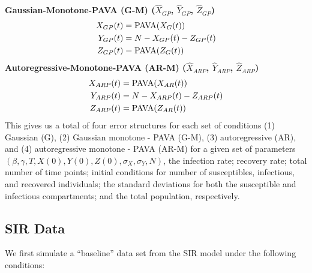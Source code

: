 \documentclass[12pt]{article}
\begin{document}
\noindent \textbf{Gaussian-Monotone-PAVA (G-M) ($\hat{X}_{GP}$, $\hat{Y}_{GP}$, $\hat{Z}_{GP}$)}
\begin{align*}
 X_{GP}(t) &= \textnormal{PAVA}(X_G(t)) \\
  Y_{GP}(t) &= N - X_{GP}(t) - Z_{GP}(t) \\
  Z_{GP}(t) &= \textnormal{PAVA}(Z_G(t)) \\
\end{align*}
\textbf{Autoregressive-Monotone-PAVA (AR-M) ($\hat{X}_{ARP}$, $\hat{Y}_{ARP}$, $\hat{Z}_{ARP}$)}
\begin{align*}
  X_{ARP}(t) &= \textnormal{PAVA}(X_{AR}(t)) \\
  Y_{ARP}(t) &= N - X_{ARP}(t) - Z_{ARP}(t) \\
  Z_{ARP}(t) &= \textnormal{PAVA}(Z_{AR}(t)) 
\end{align*}
This gives us a total of four error structures for each set of conditions  (1) Gaussian (G), (2) Gaussian monotone - PAVA (G-M),  (3) autoregressive (AR), and (4) autoregressive monotone - PAVA (AR-M) for a given set of parameters $\left (\beta, \gamma, T, X(0), Y(0), Z(0), \sigma_X, \sigma_Y, N \right )$, the infection rate; recovery rate; total number of time points; initial conditions for number of susceptibles, infectious, and recovered individuals; the standard deviations for both the susceptible and infectious compartments; and the total population, respectively.


\subsection{SIR Data}

We first simulate a ``baseline'' data set from the SIR model under the following conditions: 
\end{document}
